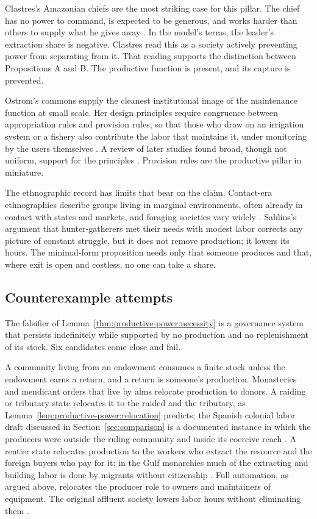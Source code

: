 \documentclass[11pt,letterpaper]{article}
\theoremstyle{definition}
\theoremstyle{remark}
\begin{document}
Clastres's Amazonian chiefs are the most striking case for this pillar. The chief has no power to command, is expected to be generous, and works harder than others to supply what he gives away \citep{clastres1987}. In the model's terms, the leader's extraction share is negative. Clastres read this as a society actively preventing power from separating from it. That reading supports the distinction between Propositions A and B. The productive function is present, and its capture is prevented.

Ostrom's commons supply the cleanest institutional image of the maintenance function at small scale. Her design principles require congruence between appropriation rules and provision rules, so that those who draw on an irrigation system or a fishery also contribute the labor that maintains it, under monitoring by the users themselves \citep{ostrom1990,ostromdesign2010}. A review of later studies found broad, though not uniform, support for the principles \citep{cox2010}. Provision rules are the productive pillar in miniature.

The ethnographic record has limits that bear on the claim. Contact-era ethnographies describe groups living in marginal environments, often already in contact with states and markets, and foraging societies vary widely \citep{kelly1995}. Sahlins's argument that hunter-gatherers met their needs with modest labor \citep{sahlins1972} corrects any picture of constant struggle, but it does not remove production; it lowers its hours. The minimal-form proposition needs only that someone produces and that, where exit is open and costless, no one can take a share.

\subsection{Counterexample attempts}

The falsifier of Lemma~\ref{thm:productive-power:necessity} is a governance system that persists indefinitely while supported by no production and no replenishment of its stock. Six candidates come close and fail.

A community living from an endowment consumes a finite stock unless the endowment earns a return, and a return is someone's production. Monasteries and mendicant orders that live by alms relocate production to donors. A raiding or tributary state relocates it to the raided and the tributary, as Lemma~\ref{lem:productive-power:relocation} predicts; the Spanish colonial labor draft discussed in Section~\ref{sec:comparison} is a documented instance in which the producers were outside the ruling community and inside its coercive reach \citep{dell2010}. A rentier state relocates production to the workers who extract the resource and the foreign buyers who pay for it; in the Gulf monarchies much of the extracting and building labor is done by migrants without citizenship \citep{hanieh2011,kapiszewski2001}. Full automation, as argued above, relocates the producer role to owners and maintainers of equipment. The original affluent society lowers labor hours without eliminating them \citep{sahlins1972}.
\end{document}
